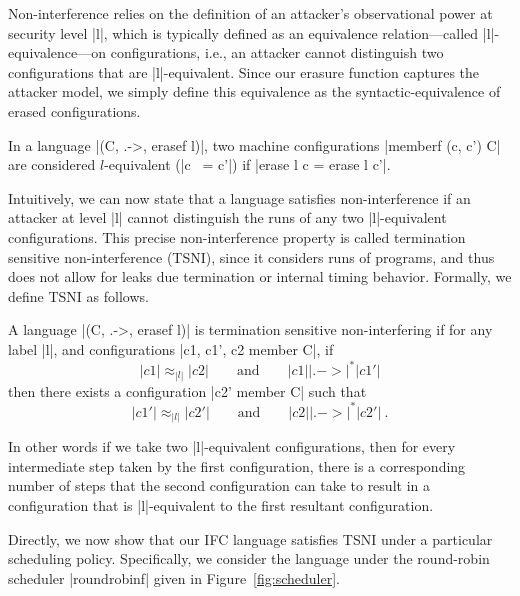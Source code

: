 Non-interference relies on the definition of an attacker's observational power at
security level |l|, which is typically defined as an equivalence
relation---called |l|-equivalence---on configurations, i.e., an attacker cannot
distinguish two configurations that are |l|-equivalent.
%
Since our erasure function captures the attacker model, we simply define this
equivalence as the syntactic-equivalence of erased configurations.
%
\begin{definition}[|l|-equivalence]
    In a language |(C, .->, erasef l)|, two machine configurations
    |memberf (c, c') C| are considered $l$-equivalent (|c ~= c'|)
    if |erase l c = erase l c'|.
\end{definition}
%

Intuitively, we can now state that a language satisfies non-interference if an
attacker at level |l| cannot distinguish the runs of any two |l|-equivalent
configurations.
%
This precise non-interference property is called termination sensitive non-interference
(TSNI), since it considers runs of programs, and thus does not allow for leaks
due termination or internal timing behavior.
%
Formally, we define TSNI as follows.

\begin{definition}
  A language |(C, .->, erasef l)| is termination
  sensitive non-interfering if for any label |l|, and configurations
  |c1, c1', c2 member C|, if
  \begin{equation} \label{eq:tsni-lhs}
    |c1| \approx_{|l|} |c2|
    \qquad \text{and} \qquad
    |c1| |.->|^* |c1'|
  \end{equation}
  then there exists a configuration |c2' member C| such that
  \begin{equation} \label{eq:tsni-rhs}
    |c1'| \approx_{|l|} |c2'|
     \qquad \text{and} \qquad
    |c2| |.->|^* |c2'|
    \ \text{.}
  \end{equation}
\end{definition}
%
In other words if we take two |l|-equivalent configurations, then for every
intermediate step taken by the first configuration, there is a corresponding
number of steps that the second configuration can take to result in a
configuration that is |l|-equivalent to the first resultant configuration.


Directly, we now show that our IFC language satisfies TSNI under a particular
scheduling policy.
%
Specifically, we consider the language under the round-robin scheduler
|roundrobinf| given in Figure~\ref{fig:scheduler}.

